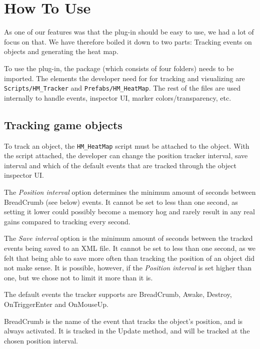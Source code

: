 \section{How To Use}
\label{HowToUse}

As one of our features was that the plug-in should be easy to use, we had a lot of focus on that. We have therefore boiled it down to two parts: Tracking events on objects and generating the heat map.

To use the plug-in, the package (which consists of four folders) needs to be imported. The elements the developer need for for tracking and visualizing are \texttt{Scripts/HM\_Tracker} and \texttt{Prefabs/HM\_HeatMap}. The rest of the files are used internally to handle events, inspector UI, marker colors/transparency, etc.

\subsection{Tracking game objects}
\label{HowToUse_Tracking}

To track an object, the \texttt{HM\_HeatMap} script must be attached to the object. With the script attached, the developer can change the position tracker interval, save interval and which of the default events that are tracked through the object inspector UI.


The \textit{Position interval} option determines the minimum amount of seconds between BreadCrumb (see below) events. It cannot be set to less than one second, as setting it lower could possibly become a memory hog and rarely result in any real gains compared to tracking every second.

The \textit{Save interval} option is the minimum amount of seconds between the tracked events being saved to an XML file. It cannot be set to less than one second, as we felt that being able to save more often than tracking the position of an object did not make sense. It is possible, however, if the \textit{Position interval} is set higher than one, but we chose not to limit it more than it is.

The default events the tracker supports are BreadCrumb, Awake, Destroy, OnTriggerEnter and OnMouseUp. 

BreadCrumb is the name of the event that tracks the object's position, and is always activated. It is tracked in the Update method, and will be tracked at the chosen position interval.

